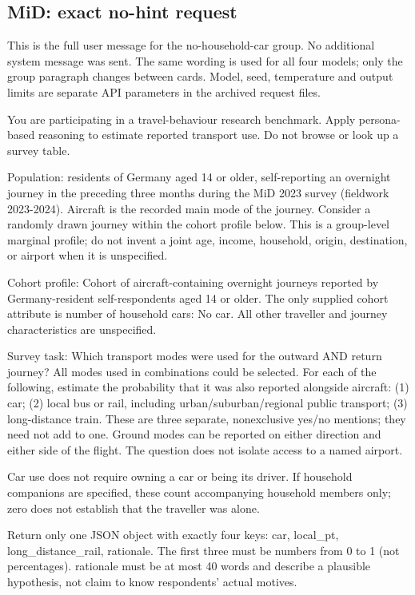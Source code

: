 \subsection{MiD: exact no-hint request}

This is the full user message for the no-household-car group. No additional system message was sent. The same wording is used for all four models; only the group paragraph changes between cards. Model, seed, temperature and output limits are separate API parameters in the archived request files.

\begin{promptbox}[title={MiD group description, without overall-rate hint}]
You are participating in a travel-behaviour research benchmark. Apply persona-based reasoning to estimate reported transport use. Do not browse or look up a survey table.

Population: residents of Germany aged 14 or older, self-reporting an overnight journey in the preceding three months during the MiD 2023 survey (fieldwork 2023-2024). Aircraft is the recorded main mode of the journey. Consider a randomly drawn journey within the cohort profile below. This is a group-level marginal profile; do not invent a joint age, income, household, origin, destination, or airport when it is unspecified.

Cohort profile: Cohort of aircraft-containing overnight journeys reported by Germany-resident self-respondents aged 14 or older. The only supplied cohort attribute is number of household cars: No car. All other traveller and journey characteristics are unspecified.

Survey task: Which transport modes were used for the outward AND return journey? All modes used in combinations could be selected. For each of the following, estimate the probability that it was also reported alongside aircraft: (1) car; (2) local bus or rail, including urban/suburban/regional public transport; (3) long-distance train. These are three separate, nonexclusive yes/no mentions; they need not add to one. Ground modes can be reported on either direction and either side of the flight. The question does not isolate access to a named airport.\par 
Car use does not require owning a car or being its driver. If household companions are specified, these count accompanying household members only; zero does not establish that the traveller was alone.

Return only one JSON object with exactly four keys: car, local\_pt, long\_distance\_rail, rationale. The first three must be numbers from 0 to 1 (not percentages). rationale must be at most 40 words and describe a plausible hypothesis, not claim to know respondents' actual motives.
\end{promptbox}


